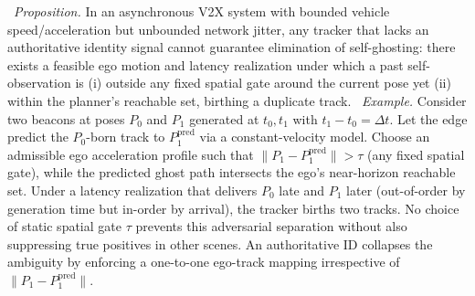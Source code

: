 ~\emph{Proposition.} In an asynchronous V2X system with bounded vehicle speed/acceleration but unbounded network jitter, any tracker that lacks an authoritative identity signal cannot guarantee elimination of self-ghosting: there exists a feasible ego motion and latency realization under which a past self-observation is (i) outside any fixed spatial gate around the current pose yet (ii) within the planner's reachable set, birthing a duplicate track.
~\emph{Example.} Consider two beacons at poses $P_0$ and $P_1$ generated at $t_0,t_1$ with $t_1-t_0=\Delta t$.
Let the edge predict the $P_0$-born track to $P^\text{pred}_1$ via a constant-velocity model. Choose an admissible ego acceleration profile such that $\|P_1-P^\text{pred}_1\|>\tau$ (any fixed spatial gate), while the predicted ghost path intersects the ego’s near-horizon reachable set. Under a latency realization that delivers $P_0$ late and $P_1$ later (out-of-order by generation time but in-order by arrival), the tracker births two tracks. No choice of static spatial gate $\tau$ prevents this adversarial separation without also suppressing true positives in other scenes. An authoritative ID collapses the ambiguity by enforcing a one-to-one ego-track mapping irrespective of $\|P_1-P^\text{pred}_1\|$.


